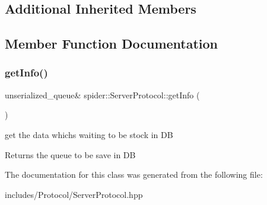 \subsection*{Additional Inherited Members}


\subsection{Member Function Documentation}
\mbox{\label{classspider_1_1_server_protocol_a3941b100fc61ae3815f2c1fec004edc0}} 
\subsubsection{\texorpdfstring{get\+Info()}{getInfo()}}
{\footnotesize\ttfamily unserialized\+\_\+queue\& spider\+::\+Server\+Protocol\+::get\+Info (\begin{DoxyParamCaption}{ }\end{DoxyParamCaption})}



get the data which\textquotesingle{}s waiting to be stock in DB 

\begin{DoxyReturn}{Returns}
the queue to be save in DB 
\end{DoxyReturn}


The documentation for this class was generated from the following file\+:\begin{DoxyCompactItemize}
\item 
includes/\+Protocol/Server\+Protocol.\+hpp\end{DoxyCompactItemize}

